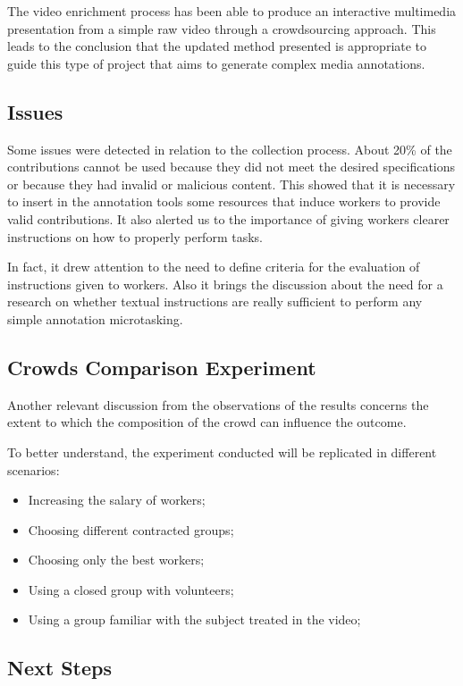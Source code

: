 The video enrichment process has been able to produce an interactive multimedia presentation from a simple raw video through a crowdsourcing approach. This leads to the conclusion that the updated method presented is appropriate to guide this type of project that aims to generate complex media annotations.

\subsection{Issues}
Some issues were detected in relation to the collection process. About 20\% of the contributions cannot be used because they did not meet the desired specifications or because they had invalid or malicious content. This showed that it is necessary to insert in the annotation tools some resources that induce workers to provide valid contributions. It also alerted us to the importance of giving workers clearer instructions on how to properly perform tasks.

In fact, it drew attention to the need to define criteria for the evaluation of instructions given to workers. Also it brings the discussion about the need for a research on whether textual instructions are really sufficient to perform any simple annotation microtasking.

\subsection{Crowds Comparison Experiment}
Another relevant discussion from the observations of the results concerns the extent to which the composition of the crowd can influence the outcome.

To better understand, the experiment conducted will be replicated in different scenarios:
\begin{itemize}
\item Increasing the salary of workers;
\item Choosing different contracted groups;
\item Choosing only the best workers;
\item Using a closed group with volunteers;
\item Using a group familiar with the subject treated in the video;
\end{itemize}

\pagebreak

\subsection{Next Steps}


